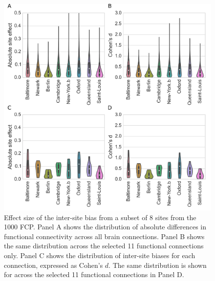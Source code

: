\documentclass[authoryear]{elsarticle}
\begin{document}
\begin{figure}[htbp]
\begin{center}
\includegraphics[width=0.8\linewidth]{../figures/effect_distribution.png}
\end{center}
\caption[inter site variability]{
Effect size of the inter-site bias from a subset of 8 sites from the 1000 FCP. Panel A shows the distribution of absolute differences in functional connectivity across all brain connections. Panel B shows the same distribution across the selected 11 functional connections only. Panel C shows the distribution of inter-site biases for each connection, expressed as Cohen's $d$. The same distribution is shown for across the selected 11 functional connections in Panel D.
}
\label{fig_site_variability}
\end{figure}
\end{document}
